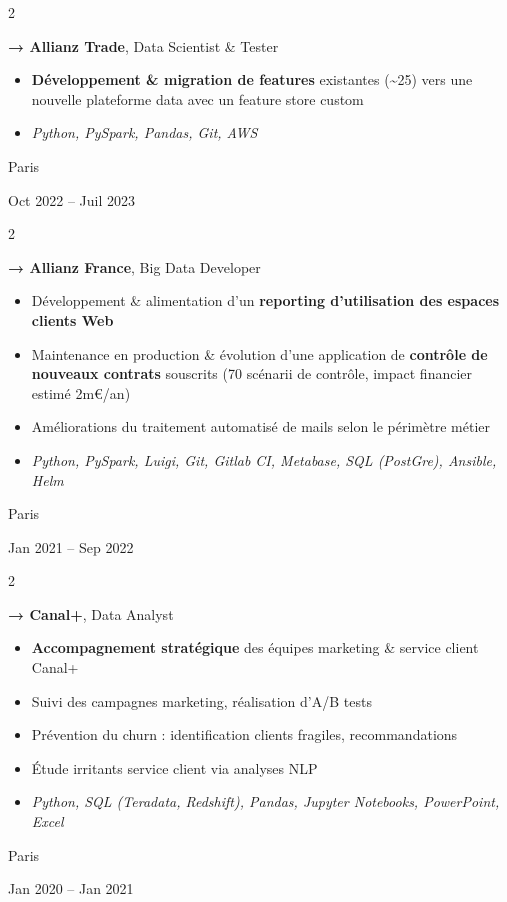 \documentclass[10pt, letterpaper]{article}
\newenvironment{highlights}{
    \begin{itemize}[
        topsep=0.10 cm,
        parsep=0.10 cm,
        partopsep=0pt,
        itemsep=0pt,
        leftmargin=0.4 cm + 10pt
    ]
}{
    \end{itemize}
} %
\newenvironment{twocolentry}[2][]{
    \onecolentry
    \def\secondColumn{#2}
    \setcolumnwidth{\fill, 3.5 cm}
    \begin{paracol}{2}
}{
    \switchcolumn \raggedleft \secondColumn
    \end{paracol}
    \endonecolentry
} %
\begin{document}
        \vspace{0.2 cm}

        \begin{twocolentry}{
            Paris

        Oct 2022 – Juil 2023
        }
            \textbf{→ Allianz Trade}, Data Scientist \& Tester
            \begin{highlights}
                \item \textbf{Développement \& migration de features} existantes (\textasciitilde{}25) vers une nouvelle plateforme data avec un feature store custom
                \item \textit{Python, PySpark, Pandas, Git, AWS}
            \end{highlights}
        \end{twocolentry}


        \vspace{0.2 cm}

        \begin{twocolentry}{
            Paris

        Jan 2021 – Sep 2022
        }
            \textbf{→ Allianz France}, Big Data Developer
            \begin{highlights}
                \item Développement \& alimentation d'un \textbf{reporting d'utilisation des espaces clients Web}
                \item Maintenance en production \& évolution d'une application de \textbf{contrôle de nouveaux contrats} souscrits (70 scénarii de contrôle, impact financier estimé 2m€/an)
                \item Améliorations du traitement automatisé de mails selon le périmètre métier
                \item \textit{Python, PySpark, Luigi, Git, Gitlab CI, Metabase, SQL (PostGre), Ansible, Helm}
            \end{highlights}
        \end{twocolentry}


        \vspace{0.2 cm}

        \begin{twocolentry}{
            Paris

        Jan 2020 – Jan 2021
        }
            \textbf{→ Canal+}, Data Analyst
            \begin{highlights}
                \item \textbf{Accompagnement stratégique} des équipes marketing \& service client Canal+
                \item Suivi des campagnes marketing, réalisation d'A/B tests
                \item Prévention du churn : identification clients fragiles, recommandations
                \item Étude irritants service client via analyses NLP
                \item \textit{Python, SQL (Teradata, Redshift), Pandas, Jupyter Notebooks, PowerPoint, Excel}
            \end{highlights}
        \end{twocolentry}
\end{document}

